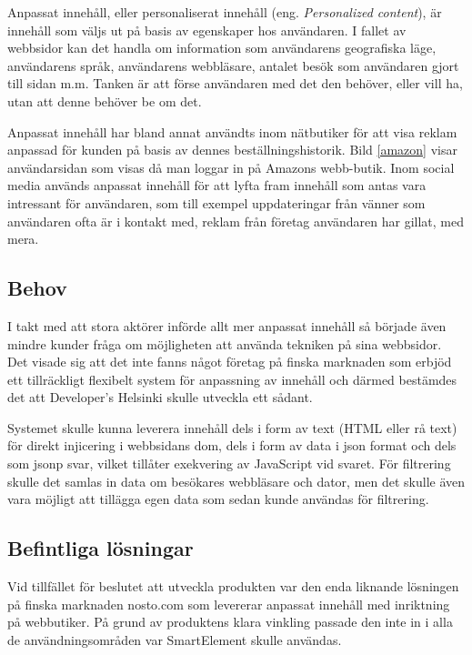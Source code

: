 Anpassat innehåll, eller personaliserat innehåll (eng. \textit{Personalized content}), är innehåll som väljs ut på basis av egenskaper hos användaren. I fallet av webbsidor kan det handla om information som användarens geografiska läge, användarens språk, användarens webbläsare, antalet besök som användaren gjort till sidan m.m. Tanken är att förse användaren med det den behöver, eller vill ha, utan att denne behöver be om det. \citep{cotacm43}

Anpassat innehåll har bland annat användts inom nätbutiker för att visa reklam anpassad för kunden på basis av dennes beställningshistorik. Bild \ref{amazon} visar användarsidan som visas då man loggar in på Amazons webb-butik. Inom social media används anpassat innehåll för att lyfta fram innehåll som antas vara intressant för användaren, som till exempel uppdateringar från vänner som användaren ofta är i kontakt med, reklam från företag användaren har gillat, med mera. \citep{socialmedia}


\subsection{Behov}

I takt med att stora aktörer införde allt mer anpassat innehåll så började även mindre kunder fråga om möjligheten att använda tekniken på sina webbsidor. Det visade sig att det inte fanns något företag på finska marknaden som erbjöd ett tillräckligt flexibelt system för anpassning av innehåll och därmed bestämdes det att Developer's Helsinki skulle utveckla ett sådant.

Systemet skulle kunna leverera innehåll dels i form av text (HTML eller rå text) för direkt injicering i webbsidans \gls{dom}, dels i form av data i \gls{json} format och dels som \gls{jsonp} svar, vilket tillåter exekvering av JavaScript vid svaret. För filtrering skulle det samlas in data om besökares webbläsare och dator, men det skulle även vara möjligt att tillägga egen data som sedan kunde användas för filtrering.

\subsection{Befintliga lösningar}

Vid tillfället för beslutet att utveckla produkten var den enda liknande lösningen på finska marknaden nosto.com som levererar anpassat innehåll med inriktning på webbutiker.\citep{nosto} På grund av produktens klara vinkling passade den inte in i alla de användningsområden var SmartElement skulle användas.


